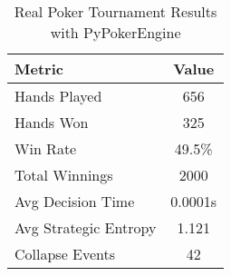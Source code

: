 \begin{table}[h]
\centering
\caption{Real Poker Tournament Results with PyPokerEngine}
\begin{tabular}{|l|c|}
\hline
Metric & Value \\
\hline
Hands Played & 656 \\
Hands Won & 325 \\
Win Rate & 49.5\% \\
Total Winnings & 2000 \\
Avg Decision Time & 0.0001s \\
Avg Strategic Entropy & 1.121 \\
Collapse Events & 42 \\
\hline
\end{tabular}
\end{table}